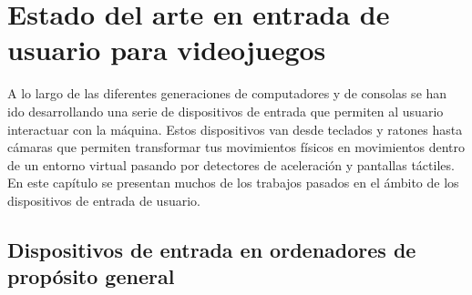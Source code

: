 %
%
%
%
%
%
%
%
%
%

\chapter{Estado del arte en entrada de usuario para videojuegos}
\label{cap2}


A lo largo de las diferentes generaciones de computadores y de consolas se han ido desarrollando una serie de dispositivos de entrada que permiten al usuario interactuar con la m\'aquina. Estos dispositivos van desde teclados y ratones hasta c\'amaras que permiten transformar tus movimientos f\'isicos en movimientos dentro de un entorno virtual pasando por detectores de aceleraci\'on y pantallas t\'actiles. En este cap\'itulo se presentan muchos de los trabajos pasados en el \'ambito de los dispositivos de entrada de usuario.\\


\section{Dispositivos de entrada en ordenadores de prop\'osito general}

